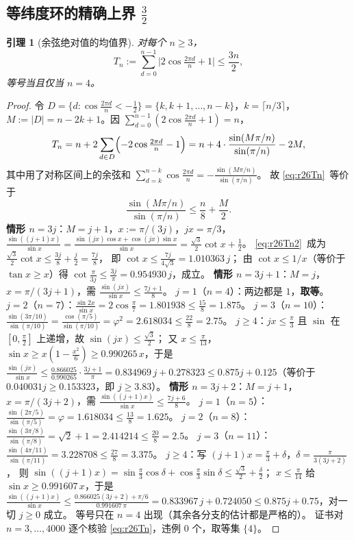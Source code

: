 \documentclass[UTF8,11pt]{ctexart}
\newtheorem{lemma}[theorem]{引理}
\theoremstyle{definition}
\begin{document}
\subsection{等纬度环的精确上界 $\frac32$}\label{sec:r26:ring}

\begin{lemma}[余弦绝对值的均值界]\label{lem:r26Tn}
对每个 $n\ge3$，
\begin{equation}\label{eq:r26Tn}
T_n:=\sum_{d=0}^{n-1}\bigl|2\cos\tfrac{2\pi d}n+1\bigr|\le\frac{3n}2 ,
\end{equation}
等号当且仅当 $n=4$。
\end{lemma}

\begin{proof}
令 $D=\{d:\cos\frac{2\pi d}n<-\frac12\}=\{k,k+1,\dots,n-k\}$，$k=\lceil n/3\rceil$，
$M:=|D|=n-2k+1$。因 $\sum_{d=0}^{n-1}(2\cos\frac{2\pi d}n+1)=n$，
\[
T_n=n+2\sum_{d\in D}\Bigl(-2\cos\tfrac{2\pi d}n-1\Bigr)
=n+4\cdot\frac{\sin(M\pi/n)}{\sin(\pi/n)}-2M ,
\]
其中用了对称区间上的余弦和
$\sum_{d=k}^{n-k}\cos\frac{2\pi d}n=-\frac{\sin(M\pi/n)}{\sin(\pi/n)}$。
故 \eqref{eq:r26Tn}~等价于
\begin{equation}\label{eq:r26Tn2}
\frac{\sin(M\pi/n)}{\sin(\pi/n)}\le\frac n8+\frac M2 .
\end{equation}
\textbf{情形 $n=3j$}：$M=j+1$，$x:=\pi/(3j)$，$jx=\pi/3$，
$\frac{\sin((j+1)x)}{\sin x}=\frac{\sin(jx)\cos x+\cos(jx)\sin x}{\sin x}
=\frac{\sqrt3}2\cot x+\frac12$。
\eqref{eq:r26Tn2}~成为 $\frac{\sqrt3}2\cot x\le\frac{3j}8+\frac j2=\frac{7j}8$，
即 $\cot x\le\frac{7j}{4\sqrt3}=1.010363\,j$；
由 $\cot x\le1/x$（等价于 $\tan x\ge x$）得 $\cot\frac\pi{3j}\le\frac{3j}\pi=0.954930\,j$，成立。
\textbf{情形 $n=3j+1$}：$M=j$，$x=\pi/(3j+1)$，需 $\frac{\sin(jx)}{\sin x}\le\frac{7j+1}8$。
$j=1$（$n=4$）：两边都是 $1$，\textbf{取等}。
$j=2$（$n=7$）：$\frac{\sin2x}{\sin x}=2\cos\frac\pi7=1.801938\le\frac{15}8=1.875$。
$j=3$（$n=10$）：$\frac{\sin(3\pi/10)}{\sin(\pi/10)}=\frac{\cos(\pi/5)}{\sin(\pi/10)}=\varphi^2=2.618034\le\frac{22}8=2.75$。
$j\ge4$：$jx\le\frac\pi3$ 且 $\sin$ 在 $[0,\frac\pi2]$ 上递增，故 $\sin(jx)\le\frac{\sqrt3}2$；
又 $x\le\frac\pi{13}$，$\sin x\ge x(1-\frac{x^2}6)\ge0.990265\,x$，于是
$\frac{\sin(jx)}{\sin x}\le\frac{0.866025}{0.990265}\cdot\frac{3j+1}\pi=0.834969\,j+0.278323
\le0.875j+0.125$（等价于 $0.040031j\ge0.153323$，即 $j\ge3.83$）。
\textbf{情形 $n=3j+2$}：$M=j+1$，$x=\pi/(3j+2)$，需 $\frac{\sin((j+1)x)}{\sin x}\le\frac{7j+6}8$。
$j=1$（$n=5$）：$\frac{\sin(2\pi/5)}{\sin(\pi/5)}=\varphi=1.618034\le\frac{13}8=1.625$。
$j=2$（$n=8$）：$\frac{\sin(3\pi/8)}{\sin(\pi/8)}=\sqrt2+1=2.414214\le\frac{20}8=2.5$。
$j=3$（$n=11$）：$\frac{\sin(4\pi/11)}{\sin(\pi/11)}=3.228708\le\frac{27}8=3.375$。
$j\ge4$：写 $(j+1)x=\frac\pi3+\delta$，$\delta=\frac\pi{3(3j+2)}$，
则 $\sin((j+1)x)=\sin\frac\pi3\cos\delta+\cos\frac\pi3\sin\delta\le\frac{\sqrt3}2+\frac\delta2$；
$x\le\frac\pi{14}$ 给 $\sin x\ge0.991607\,x$，于是
$\frac{\sin((j+1)x)}{\sin x}\le\frac{0.866025(3j+2)+\pi/6}{0.991607\,\pi}
=0.833967\,j+0.724050\le0.875j+0.75$，对一切 $j\ge0$ 成立。
等号只在 $n=4$ 出现（其余各分支的估计都是严格的）。
证书对 $n=3,\dots,4000$ 逐个核验 \eqref{eq:r26Tn}，违例 $0$ 个，取等集 $\{4\}$。
\end{proof}
\end{document}
